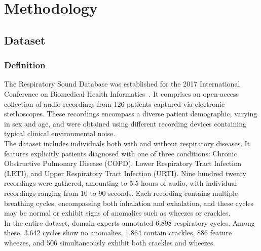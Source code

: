 \cleardoubleoddpage%
\chapter{Methodology}

\section{Dataset}
\subsection{Definition}
The Respiratory Sound Database was established for the 2017 International Conference on Biomedical Health Informatics~\cite{rocha2018alpha}. It comprises an open-access collection of audio recordings from 126 patients captured via electronic stethoscopes. These recordings encompass a diverse patient demographic, varying in sex and age, and were obtained using different recording devices containing typical clinical environmental noise.\\
The dataset includes individuals both with and without respiratory diseases. It features explicitly patients diagnosed with one of three conditions: Chronic Obstructive Pulmonary Disease (COPD), Lower Respiratory Tract Infection (LRTI), and Upper Respiratory Tract Infection (URTI). Nine hundred twenty recordings were gathered, amounting to 5.5 hours of audio, with individual recordings ranging from 10 to 90 seconds. Each recording contains multiple breathing cycles, encompassing both inhalation and exhalation, and these cycles may be normal or exhibit signs of anomalies such as wheezes or crackles.\\
In the entire dataset, domain experts annotated 6.898 respiratory cycles. Among these, 3.642 cycles show no anomalies, 1.864 contain crackles, 886 feature wheezes, and 506 simultaneously exhibit both crackles and wheezes.

